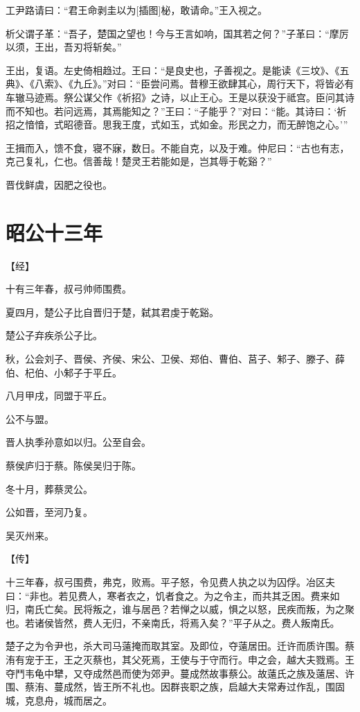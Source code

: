 \documentclass[a4paper,12pt,UTF8,twoside]{ctexbook}
\begin{document}
工尹路请曰：“君王命剥圭以为[插图]柲，敢请命。”王入视之。

析父谓子革：“吾子，楚国之望也！今与王言如响，国其若之何？”子革曰：“摩厉以须，王出，吾刃将斩矣。”

王出，复语。左史倚相趋过。王曰：“是良史也，子善视之。是能读《三坟》、《五典》、《八索》、《九丘》。”对曰：“臣尝问焉。昔穆王欲肆其心，周行天下，将皆必有车辙马迹焉。祭公谋父作《祈招》之诗，以止王心。王是以获没于祗宫。臣问其诗而不知也。若问远焉，其焉能知之？”王曰：“子能乎？”对曰：“能。其诗曰：‘祈招之愔愔，式昭德音。思我王度，式如玉，式如金。形民之力，而无醉饱之心。’”

王揖而入，馈不食，寝不寐，数日。不能自克，以及于难。仲尼曰：“古也有志，克己复礼，仁也。信善哉！楚灵王若能如是，岂其辱于乾谿？”

晋伐鲜虞，因肥之役也。


\section{昭公十三年}



【经】

十有三年春，叔弓帅师围费。

夏四月，楚公子比自晋归于楚，弑其君虔于乾谿。

楚公子弃疾杀公子比。

秋，公会刘子、晋侯、齐侯、宋公、卫侯、郑伯、曹伯、莒子、邾子、滕子、薛伯、杞伯、小邾子于平丘。

八月甲戌，同盟于平丘。

公不与盟。

晋人执季孙意如以归。公至自会。

蔡侯庐归于蔡。陈侯吴归于陈。

冬十月，葬蔡灵公。

公如晋，至河乃复。

吴灭州来。

【传】

十三年春，叔弓围费，弗克，败焉。平子怒，令见费人执之以为囚俘。冶区夫曰：“非也。若见费人，寒者衣之，饥者食之。为之令主，而共其乏困。费来如归，南氏亡矣。民将叛之，谁与居邑？若惮之以威，惧之以怒，民疾而叛，为之聚也。若诸侯皆然，费人无归，不亲南氏，将焉入矣？”平子从之。费人叛南氏。

楚子之为令尹也，杀大司马薳掩而取其室。及即位，夺薳居田。迁许而质许围。蔡洧有宠于王，王之灭蔡也，其父死焉，王使与于守而行。申之会，越大夫戮焉。王夺鬥韦龟中犫，又夺成然邑而使为郊尹。蔓成然故事蔡公。故薳氏之族及薳居、许围、蔡洧、蔓成然，皆王所不礼也。因群丧职之族，启越大夫常寿过作乱，围固城，克息舟，城而居之。
\end{document}
